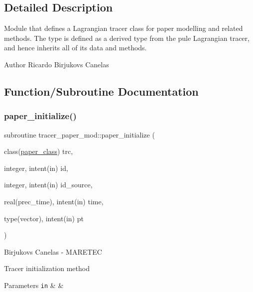 \subsection{Detailed Description}
Module that defines a Lagrangian tracer class for paper modelling and related methods. The type is defined as a derived type from the pule Lagrangian tracer, and hence inherits all of it\textquotesingle{}s data and methods. 

\begin{DoxyAuthor}{Author}
Ricardo Birjukovs Canelas 
\end{DoxyAuthor}


\subsection{Function/\+Subroutine Documentation}
\mbox{\label{namespacetracer__paper__mod_a4e3b16f967d34cd206499188e17ac4f2}} 
\subsubsection{\texorpdfstring{paper\+\_\+initialize()}{paper\_initialize()}}
{\footnotesize\ttfamily subroutine tracer\+\_\+paper\+\_\+mod\+::paper\+\_\+initialize (\begin{DoxyParamCaption}\item[{class(\hyperlink{structtracer__paper__mod_1_1paper__class}{paper\+\_\+class})}]{trc,  }\item[{integer, intent(in)}]{id,  }\item[{integer, intent(in)}]{id\+\_\+source,  }\item[{real(prec\+\_\+time), intent(in)}]{time,  }\item[{type(vector), intent(in)}]{pt }\end{DoxyParamCaption})\hspace{0.3cm}{\ttfamily [private]}}



Birjukovs Canelas -\/ M\+A\+R\+E\+T\+EC 

Tracer initialization method 
\begin{DoxyParams}[1]{Parameters}
\mbox{\tt in}  & {\em } & \\
\hline
\end{DoxyParams}
